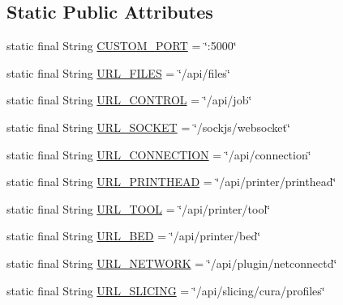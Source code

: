 \subsection*{Static Public Attributes}
\begin{DoxyCompactItemize}
\item 
static final String \hyperlink{classandroid_1_1app_1_1printerapp_1_1octoprint_1_1_http_utils_a1ce03df307d0092f47f2170726ee94fb}{C\+U\+S\+T\+O\+M\+\_\+\+P\+O\+RT} = \char`\"{}\+:5000\char`\"{}
\item 
static final String \hyperlink{classandroid_1_1app_1_1printerapp_1_1octoprint_1_1_http_utils_aa64197d8626f4f522cd7f933438edcee}{U\+R\+L\+\_\+\+F\+I\+L\+ES} = \char`\"{}/api/files\char`\"{}
\item 
static final String \hyperlink{classandroid_1_1app_1_1printerapp_1_1octoprint_1_1_http_utils_a89d42b1b8f07e385fb83e71eddade82c}{U\+R\+L\+\_\+\+C\+O\+N\+T\+R\+OL} = \char`\"{}/api/job\char`\"{}
\item 
static final String \hyperlink{classandroid_1_1app_1_1printerapp_1_1octoprint_1_1_http_utils_af5cbdaf40bac8537a6023f13cc6931da}{U\+R\+L\+\_\+\+S\+O\+C\+K\+ET} = \char`\"{}/sockjs/websocket\char`\"{}
\item 
static final String \hyperlink{classandroid_1_1app_1_1printerapp_1_1octoprint_1_1_http_utils_a181009b21a94e02d02d09fb93646ebd9}{U\+R\+L\+\_\+\+C\+O\+N\+N\+E\+C\+T\+I\+ON} = \char`\"{}/api/connection\char`\"{}
\item 
static final String \hyperlink{classandroid_1_1app_1_1printerapp_1_1octoprint_1_1_http_utils_a5d16c358772372612464c9a9a6a7984c}{U\+R\+L\+\_\+\+P\+R\+I\+N\+T\+H\+E\+AD} = \char`\"{}/api/printer/printhead\char`\"{}
\item 
static final String \hyperlink{classandroid_1_1app_1_1printerapp_1_1octoprint_1_1_http_utils_af5063b6f9b5df3e59f45fd2c2044ed5f}{U\+R\+L\+\_\+\+T\+O\+OL} = \char`\"{}/api/printer/tool\char`\"{}
\item 
static final String \hyperlink{classandroid_1_1app_1_1printerapp_1_1octoprint_1_1_http_utils_a5f734669fe1b16cd23ba26e694c8718c}{U\+R\+L\+\_\+\+B\+ED} = \char`\"{}/api/printer/bed\char`\"{}
\item 
static final String \hyperlink{classandroid_1_1app_1_1printerapp_1_1octoprint_1_1_http_utils_a536cfa6823d75375bd9dc51147c1c0aa}{U\+R\+L\+\_\+\+N\+E\+T\+W\+O\+RK} = \char`\"{}/api/plugin/netconnectd\char`\"{}
\item 
static final String \hyperlink{classandroid_1_1app_1_1printerapp_1_1octoprint_1_1_http_utils_a90b784ef134f71e3851adb4d2f24dfef}{U\+R\+L\+\_\+\+S\+L\+I\+C\+I\+NG} = \char`\"{}/api/slicing/cura/profiles\char`\"{}

\end{DoxyCompactItemize}
